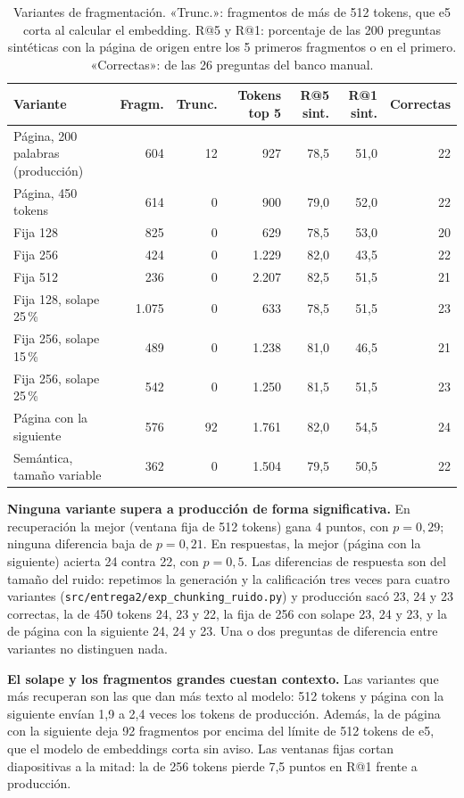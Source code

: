 \documentclass[11pt,letterpaper]{article}
\newcommand{\cod}[1]{\texttt{\small #1}}
\begin{document}
\begin{table}[H]\footnotesize\renewcommand{\arraystretch}{1.12}\centering
\begin{tabular}{lrrrrrr}
\toprule
\textbf{Variante} & \textbf{Fragm.} & \textbf{Trunc.} & \textbf{Tokens top 5} & \textbf{R@5 sint.} & \textbf{R@1 sint.} & \textbf{Correctas} \\
\midrule
Página, 200 palabras (producción) & 604 & 12 & 927 & 78,5 & 51,0 & 22 \\
Página, 450 tokens & 614 & 0 & 900 & 79,0 & 52,0 & 22 \\
Fija 128 & 825 & 0 & 629 & 78,5 & 53,0 & 20 \\
Fija 256 & 424 & 0 & 1.229 & 82,0 & 43,5 & 22 \\
Fija 512 & 236 & 0 & 2.207 & 82,5 & 51,5 & 21 \\
Fija 128, solape 25\,\% & 1.075 & 0 & 633 & 78,5 & 51,5 & 23 \\
Fija 256, solape 15\,\% & 489 & 0 & 1.238 & 81,0 & 46,5 & 21 \\
Fija 256, solape 25\,\% & 542 & 0 & 1.250 & 81,5 & 51,5 & 23 \\
Página con la siguiente & 576 & 92 & 1.761 & 82,0 & 54,5 & 24 \\
Semántica, tamaño variable & 362 & 0 & 1.504 & 79,5 & 50,5 & 22 \\
\bottomrule
\end{tabular}
\caption{Variantes de fragmentación. «Trunc.»: fragmentos de más de 512 tokens, que e5 corta al calcular el embedding. R@5 y R@1: porcentaje de las 200 preguntas sintéticas con la página de origen entre los 5 primeros fragmentos o en el primero. «Correctas»: de las 26 preguntas del banco manual.}
\label{tab:chunking}
\end{table}

\textbf{Ninguna variante supera a producción de forma significativa.} En recuperación la mejor (ventana fija de 512 tokens) gana 4 puntos, con $p = 0{,}29$; ninguna diferencia baja de $p = 0{,}21$. En respuestas, la mejor (página con la siguiente) acierta 24 contra 22, con $p = 0{,}5$. Las diferencias de respuesta son del tamaño del ruido: repetimos la generación y la calificación tres veces para cuatro variantes (\cod{src/entrega2/exp\_chunking\_ruido.py}) y producción sacó 23, 24 y 23 correctas, la de 450 tokens 24, 23 y 22, la fija de 256 con solape 23, 24 y 23, y la de página con la siguiente 24, 24 y 23. Una o dos preguntas de diferencia entre variantes no distinguen nada.

\textbf{El solape y los fragmentos grandes cuestan contexto.} Las variantes que más recuperan son las que dan más texto al modelo: 512 tokens y página con la siguiente envían 1,9 a 2,4 veces los tokens de producción. Además, la de página con la siguiente deja 92 fragmentos por encima del límite de 512 tokens de e5, que el modelo de embeddings corta sin aviso. Las ventanas fijas cortan diapositivas a la mitad: la de 256 tokens pierde 7,5 puntos en R@1 frente a producción.
\end{document}
